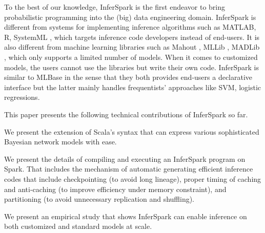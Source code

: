 To the best of our knowledge, InferSpark is the first endeavor to bring
probabilistic programming into the (big) data engineering domain.  
InferSpark is different from systems
for implementing inference algorithms such as MATLAB, R, SystemML
\cite{systemml}, which targets inference code developers instead of end-users.
It is also different from machine learning libraries such as Mahout
\cite{mahout}, MLLib \cite{mllib}, MADLib \cite{madlib}, which only supports a
limited number of models. When it comes to customized models, the users cannot
use the libraries but write their own code. InferSpark is similar to MLBase
\cite{mlbase} in the sense that they both provides end-users a declarative
interface but the latter mainly handles frequentists' approaches like SVM,
logistic regressions. 

This paper presents the following technical contributions of InferSpark so far.
\begin{packed_enum}
\item We present the extension of Scala's syntax that can express various sophisticated 
Bayesian network models with ease.
\item We present the details of compiling and executing an InferSpark program on Spark.
That includes the mechanism of automatic generating efficient inference codes that 
include checkpointing (to avoid long lineage), proper timing of caching and 
anti-caching (to improve efficiency under memory constraint),
 and partitioning (to avoid unnecessary replication and shuffling).
\item We present an empirical study that shows InferSpark can enable 
inference on both customized and standard models at scale.
\end{packed_enum}

